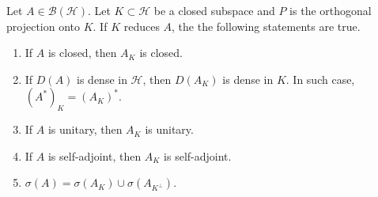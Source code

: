 \documentclass[a4paper,12pt]{article}
\begin{document}
\begin{prop}
    Let $A \in \mathcal{B}(\mathcal{H})$. Let $K \subset \mathcal{H}$ be a closed subspace and $P$ is the orthogonal projection onto $K$. If $K$ reduces $A$, the the following statements are true.
    \begin{enumerate}[label=(\arabic{*})]
        \item If $A$ is closed, then $A_K$ is closed.
        \item If $D(A)$ is dense in $\mathcal{H}$, then $D(A_K)$ is dense in $K$. In such case, $(A^*)_K = (A_K)^*$.
        \item If $A$ is unitary, then $A_K$ is unitary.
        \item If $A$ is self-adjoint, then $A_K$ is self-adjoint.
        \item $\sigma(A) = \sigma(A_K) \cup \sigma(A_{K^\perp})$.
    \end{enumerate}
\end{prop}
\end{document}
